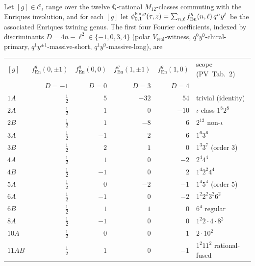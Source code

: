 \begin{theorem}
\label{thm:bkm-enriques-m12-twining-table}
Let $[g]\in\mathcal{C}_\iota$ range over the twelve $\mathbb{Q}$-rational
$M_{12}$-classes commuting with the Enriques involution, and for each
$[g]$ let
$\phi^{\mathrm{En},g}_{0,1}(\tau,z) = \sum_{n,\ell}f^g_{\mathrm{En}}(n,\ell)\,q^n y^\ell$
be the associated Enriques twining genus. The first four Fourier
coefficients, indexed by discriminants $D = 4n - \ell^2\in\{-1, 0, 3, 4\}$
(polar $V_{\mathrm{real}}$-witness, $q^0 y^0$-chiral-primary,
$q^1 y^{\pm 1}$-massive-short, $q^1 y^0$-massive-long), are
\begin{center}
\renewcommand{\arraystretch}{1.12}
\begin{tabular}{l|r|r|r|r|l}
\toprule
$[g]$ & $f^g_{\mathrm{En}}(0,\pm 1)$ & $f^g_{\mathrm{En}}(0,0)$
 & $f^g_{\mathrm{En}}(1,\pm 1)$ & $f^g_{\mathrm{En}}(1,0)$
 & scope (PV~Tab.~2) \\
 & $D = -1$ & $D = 0$ & $D = 3$ & $D = 4$ & \\
\midrule
$1A$ & $\tfrac{1}{2}$ & $5$ & $-32$ & $54$ & trivial (identity) \\
$2A$ & $\tfrac{1}{2}$ & $1$ & $0$ & $-10$ & $\iota$-class $1^8 2^8$ \\
$2B$ & $\tfrac{1}{2}$ & $1$ & $-8$ & $6$ & $2^{12}$ non-$\iota$ \\
$3A$ & $\tfrac{1}{2}$ & $-1$ & $2$ & $6$ & $1^6 3^6$ \\
$3B$ & $\tfrac{1}{2}$ & $2$ & $1$ & $0$ & $1^3 3^7$ (order $3$) \\
$4A$ & $\tfrac{1}{2}$ & $1$ & $0$ & $-2$ & $2^4 4^4$ \\
$4B$ & $\tfrac{1}{2}$ & $-1$ & $0$ & $2$ & $1^4 2^2 4^4$ \\
$5A$ & $\tfrac{1}{2}$ & $0$ & $-2$ & $-1$ & $1^4 5^4$ (order $5$) \\
$6A$ & $\tfrac{1}{2}$ & $-1$ & $0$ & $-2$ & $1^2 2^2 3^2 6^2$ \\
$6B$ & $\tfrac{1}{2}$ & $1$ & $1$ & $0$ & $6^4$ regular \\
$8A$ & $\tfrac{1}{2}$ & $-1$ & $0$ & $0$ & $1^2 2\cdot 4\cdot 8^2$ \\
$10A$ & $\tfrac{1}{2}$ & $0$ & $0$ & $1$ & $2\cdot 10^2$ \\
$11AB$ & $\tfrac{1}{2}$ & $1$ & $0$ & $-1$ & $1^2 11^2$ rational-fused \\

\end{tabular}
\end{center}
\end{theorem}
